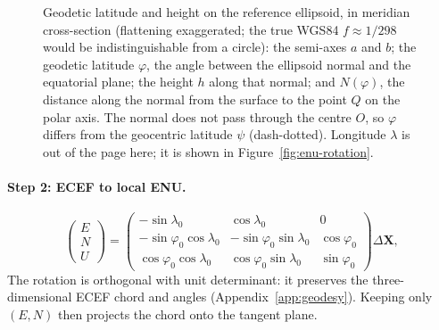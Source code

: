 \begin{figure}[htbp]
  \caption{Geodetic latitude and height on the reference ellipsoid, in meridian
  cross-section (flattening exaggerated; the true WGS84 $f\approx1/298$ would be
  indistinguishable from a circle): the semi-axes $a$ and $b$; the geodetic latitude
  $\varphi$, the angle between the ellipsoid normal and the equatorial plane; the height
  $h$ along that normal; and $N(\varphi)$, the distance along the normal from the surface
  to the point $Q$ on the polar axis. The normal does not pass through the centre $O$, so
  $\varphi$ differs from the geocentric latitude $\psi$ (dash-dotted). Longitude
  $\lambda$ is out of the page here; it is shown in Figure~\ref{fig:enu-rotation}.}
  \label{fig:ellipsoid}
\end{figure}

\paragraph{Step 2: ECEF to local ENU.} 
\begin{equation}
\begin{pmatrix}E\\N\\U\end{pmatrix}=
\begin{pmatrix}
-\sin\lambda_0 & \cos\lambda_0 & 0\\
-\sin\varphi_0\cos\lambda_0 & -\sin\varphi_0\sin\lambda_0 & \cos\varphi_0\\
\cos\varphi_0\cos\lambda_0 & \cos\varphi_0\sin\lambda_0 & \sin\varphi_0
\end{pmatrix}
\Delta\mathbf{X},
\end{equation}
The rotation is orthogonal with unit determinant: it preserves the three-dimensional
ECEF chord and angles (Appendix~\ref{app:geodesy}). Keeping only $(E,N)$ then
projects the chord onto the tangent plane.

